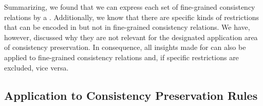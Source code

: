 
Summarizing, we found that we can express each set of fine-grained consistency relations by a \modellevelconsistencyrelation.
Additionally, we know that there are specific kinds of restrictions that can be encoded in \modellevelconsistencyrelations but not in fine-grained consistency relations.
We have, however, discussed why they are not relevant for the designated application area of consistency preservation.
In consequence, all insights made for \modellevelconsistencyrelations can also be applied to fine-grained consistency relations and, if specific restrictions are excluded, vice versa.





\subsection{Application to Consistency Preservation Rules}


